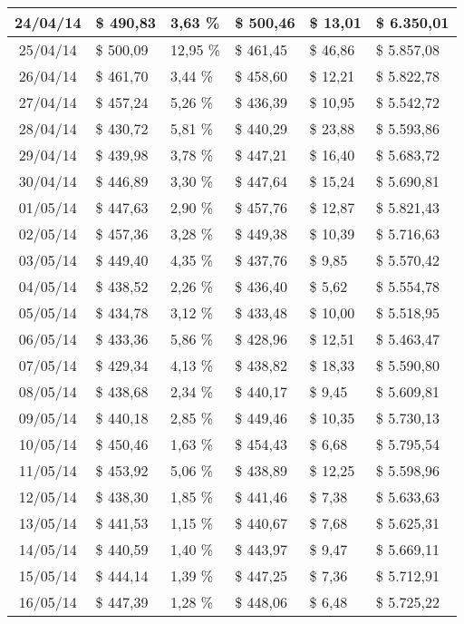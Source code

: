 \begin{small}
\begin{longtable}{|c|l|l|l|l|l|}
24/04/14 & \$ 490,83 & 3,63 \% & \$ 500,46 & \$ 13,01 & \$ 6.350,01 \\ \hline
25/04/14 & \$ 500,09 & 12,95 \% & \$ 461,45 & \$ 46,86 & \$ 5.857,08 \\ \hline
26/04/14 & \$ 461,70 & 3,44 \% & \$ 458,60 & \$ 12,21 & \$ 5.822,78 \\ \hline
27/04/14 & \$ 457,24 & 5,26 \% & \$ 436,39 & \$ 10,95 & \$ 5.542,72 \\ \hline
28/04/14 & \$ 430,72 & 5,81 \% & \$ 440,29 & \$ 23,88 & \$ 5.593,86 \\ \hline
29/04/14 & \$ 439,98 & 3,78 \% & \$ 447,21 & \$ 16,40 & \$ 5.683,72 \\ \hline
30/04/14 & \$ 446,89 & 3,30 \% & \$ 447,64 & \$ 15,24 & \$ 5.690,81 \\ \hline
01/05/14 & \$ 447,63 & 2,90 \% & \$ 457,76 & \$ 12,87 & \$ 5.821,43 \\ \hline
02/05/14 & \$ 457,36 & 3,28 \% & \$ 449,38 & \$ 10,39 & \$ 5.716,63 \\ \hline
03/05/14 & \$ 449,40 & 4,35 \% & \$ 437,76 & \$ 9,85 & \$ 5.570,42 \\ \hline
04/05/14 & \$ 438,52 & 2,26 \% & \$ 436,40 & \$ 5,62 & \$ 5.554,78 \\ \hline
05/05/14 & \$ 434,78 & 3,12 \% & \$ 433,48 & \$ 10,00 & \$ 5.518,95 \\ \hline
06/05/14 & \$ 433,36 & 5,86 \% & \$ 428,96 & \$ 12,51 & \$ 5.463,47 \\ \hline
07/05/14 & \$ 429,34 & 4,13 \% & \$ 438,82 & \$ 18,33 & \$ 5.590,80 \\ \hline
08/05/14 & \$ 438,68 & 2,34 \% & \$ 440,17 & \$ 9,45 & \$ 5.609,81 \\ \hline
09/05/14 & \$ 440,18 & 2,85 \% & \$ 449,46 & \$ 10,35 & \$ 5.730,13 \\ \hline
10/05/14 & \$ 450,46 & 1,63 \% & \$ 454,43 & \$ 6,68 & \$ 5.795,54 \\ \hline
11/05/14 & \$ 453,92 & 5,06 \% & \$ 438,89 & \$ 12,25 & \$ 5.598,96 \\ \hline
12/05/14 & \$ 438,30 & 1,85 \% & \$ 441,46 & \$ 7,38 & \$ 5.633,63 \\ \hline
13/05/14 & \$ 441,53 & 1,15 \% & \$ 440,67 & \$ 7,68 & \$ 5.625,31 \\ \hline
14/05/14 & \$ 440,59 & 1,40 \% & \$ 443,97 & \$ 9,47 & \$ 5.669,11 \\ \hline
15/05/14 & \$ 444,14 & 1,39 \% & \$ 447,25 & \$ 7,36 & \$ 5.712,91 \\ \hline
16/05/14 & \$ 447,39 & 1,28 \% & \$ 448,06 & \$ 6,48 & \$ 5.725,22 \\ \hline

\end{longtable}
\end{small}
